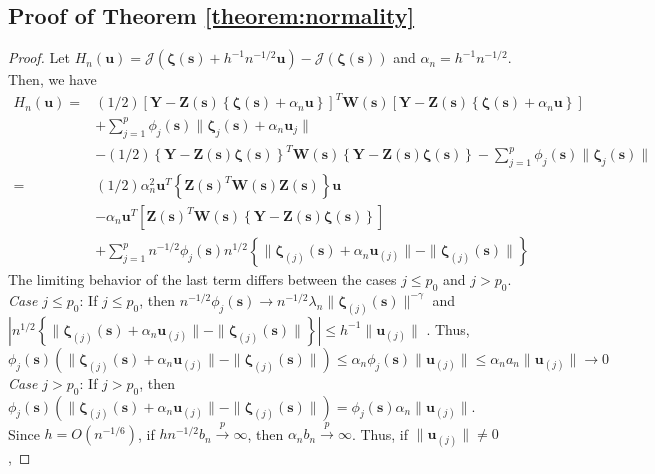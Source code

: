 \documentclass[authoryear,review, 12pt]{elsarticle}
\begin{document}
\subsection*{Proof of Theorem \ref{theorem:normality}\label{sec:gaussian-normality-proof} }
\begin{proof}
Let $H_{n}(\bm{u})=\mathcal{J}\left(\bm{\zeta}(\bm{s})+h^{-1}n^{-1/2}\bm{u}\right)-\mathcal{J}\left(\bm{\zeta}(\bm{s})\right)$
and $\alpha_{n}=h^{-1}n^{-1/2}$. Then, we have 
\begin{align*}
H_{n}(\bm{u})= & (1/2)\left[\bm{Y}-\bm{Z}(\bm{s})\left\{ \bm{\zeta}(\bm{s})+\alpha_{n}\bm{u}\right\} \right]^{T}\bm{W}\!(\bm{s})\left[\bm{Y}-\bm{Z}(\bm{s})\left\{ \bm{\zeta}(\bm{s})+\alpha_{n}\bm{u}\right\} \right]\\
 & +\sum_{j=1}^{p}\phi_{j}(\bm{s})\|\bm{\zeta}_{j}(\bm{s})+\alpha_{n}\bm{u}_{j}\|\\
 & -(1/2)\left\{ \bm{Y}-\bm{Z}(\bm{s})\bm{\zeta}(\bm{s})\right\} ^{T}\bm{W}\!(\bm{s})\left\{ \bm{Y}-\bm{Z}(\bm{s})\bm{\zeta}(\bm{s})\right\} -\sum_{j=1}^{p}\phi_{j}(\bm{s})\|\bm{\zeta}_{j}(\bm{s})\|\\
= & \left(1/2\right)\alpha_{n}^{2}\bm{u}^{T}\left\{ \bm{Z}(\bm{s})^{T}\bm{W}\!(\bm{s})\bm{Z}(\bm{s})\right\} \bm{u}\\
 & -\alpha_{n}\bm{u}^{T}\left[\bm{Z}(\bm{s})^{T}\bm{W}\!(\bm{s})\left\{ \bm{Y}-\bm{Z}(\bm{s})\bm{\zeta}(\bm{s})\right\} \right]\\
 & +\sum_{j=1}^{p}n^{-1/2}\phi_{j}(\bm{s})n^{1/2}\left\{ \|\bm{\zeta}_{(j)}(\bm{s})+\alpha_{n}\bm{u}_{(j)}\|-\|\bm{\zeta}_{(j)}(\bm{s})\|\right\} 
\end{align*}
The limiting behavior of the last term differs between the cases $j\le p_{0}$
and $j>p_{0}$.
\emph{Case $j\le p_{0}$}: If $j\le p_{0}$, then $n^{-1/2}\phi_{j}(\bm{s})\to n^{-1/2}\lambda_{n}\|\bm{\zeta}_{(j)}(\bm{s})\|^{-\gamma}$
and $|n^{1/2}\left\{ \|\bm{\zeta}_{(j)}(\bm{s})+\alpha_{n}\bm{u}_{(j)}\|-\|\bm{\zeta}_{(j)}(\bm{s})\|\right\} |\le h^{-1}\|\bm{u}_{(j)}\|$
. Thus, 
\[
\phi_{j}(\bm{s})\left(\|\bm{\zeta}_{(j)}(\bm{s})+\alpha_{n}\bm{u}_{(j)}\|-\|\bm{\zeta}_{(j)}(\bm{s})\|\right)\le\alpha_{n}\phi_{j}(\bm{s})\|\bm{u}_{(j)}\|\le\alpha_{n}a_{n}\|\bm{u}_{(j)}\|\to0
\]
\emph{Case $j>p_{0}$}: If $j>p_{0}$, then $\phi_{j}(\bm{s})\left(\|\bm{\zeta}_{(j)}(\bm{s})+\alpha_{n}\bm{u}_{(j)}\|-\|\bm{\zeta}_{(j)}(\bm{s})\|\right)=\phi_{j}(\bm{s})\alpha_{n}\|\bm{u}_{(j)}\|$.
Since $h=O(n^{-1/6})$, if $hn^{-1/2}b_{n}\xrightarrow{p}\infty$,
then $\alpha_{n}b_{n}\xrightarrow{p}\infty$. Thus, if $\|\bm{u}_{(j)}\|\ne0$,

\end{proof}
\end{document}
